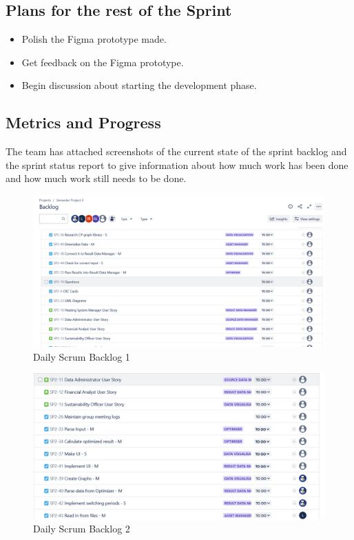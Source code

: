 \documentclass[12pt]{report}
\begin{document}
\subsection*{Plans for the rest of the Sprint}
\begin{itemize}
    \item Polish the Figma prototype made.
    \item Get feedback on the Figma prototype.
    \item Begin discussion about starting the development phase.
\end{itemize}

\subsection*{Metrics and Progress}
The team has attached screenshots of the current state of the sprint backlog and the sprint status report to give information about how much work has been done and how much work still needs to be done.

\begin{figure}[H]
  \centering
  \includegraphics[width=1\textwidth]{Resources/2-Sprint/Daily-Scrum/backlog1.png}
  \caption{Daily Scrum Backlog 1}
  \label{fig:S2Scrum1-image}
\end{figure}

\begin{figure}[H]
  \centering
  \includegraphics[width=1\textwidth]{Resources/2-Sprint/Daily-Scrum/backlog2.png}
  \caption{Daily Scrum Backlog 2}
  \label{fig:S2Scrum2-image}
\end{figure}
\end{document}
